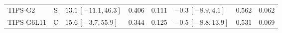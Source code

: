 \begin{longtable}{lcp{37mm}rrp{37mm}rr}
TIPS-G2 & S & \(13.1\,[-11.1,46.3]\) & 0.406 & 0.111 & \(-0.3\,[-8.9,4.1]\) & 0.562 & 0.062\\
TIPS-G6L11 & C & \(15.6\,[-3.7,55.9]\) & 0.344 & 0.125 & \(-0.5\,[-8.8,13.9]\) & 0.531 & 0.069\\

\end{longtable}
